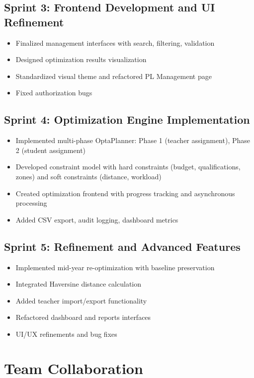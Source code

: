 \documentclass[12pt,a4paper]{report}
\begin{document}
\subsection{Sprint 3: Frontend Development and UI Refinement}
\begin{itemize}
    \item Finalized management interfaces with search, filtering, validation
    \item Designed optimization results visualization
    \item Standardized visual theme and refactored PL Management page
    \item Fixed authorization bugs
\end{itemize}

\subsection{Sprint 4: Optimization Engine Implementation}
\begin{itemize}
    \item Implemented multi-phase OptaPlanner: Phase 1 (teacher assignment), Phase 2 (student assignment)
    \item Developed constraint model with hard constraints (budget, qualifications, zones) and soft constraints (distance, workload)
    \item Created optimization frontend with progress tracking and asynchronous processing
    \item Added CSV export, audit logging, dashboard metrics
\end{itemize}

\subsection{Sprint 5: Refinement and Advanced Features}
\begin{itemize}
    \item Implemented mid-year re-optimization with baseline preservation
    \item Integrated Haversine distance calculation
    \item Added teacher import/export functionality
    \item Refactored dashboard and reports interfaces
    \item UI/UX refinements and bug fixes
\end{itemize}

\section{Team Collaboration}
\end{document}
